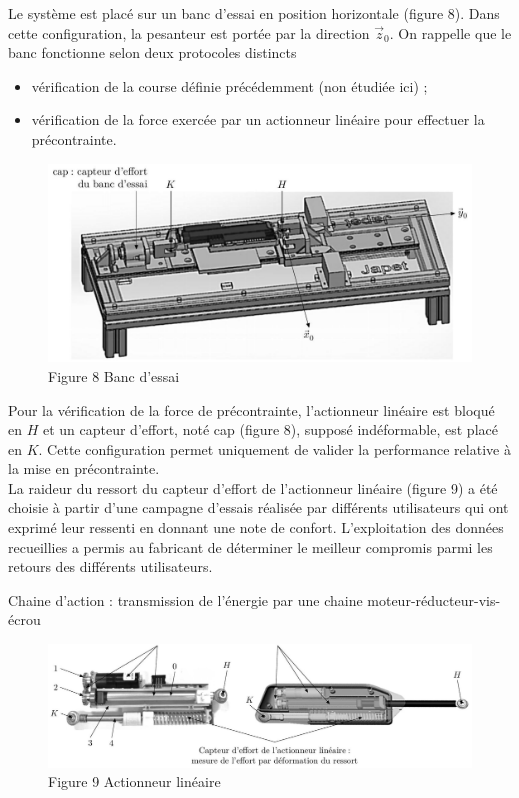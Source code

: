 \documentclass[10pt]{article}
\begin{document}
Le système est placé sur un banc d'essai en position horizontale (figure 8). Dans cette configuration, la pesanteur est portée par la direction $\vec{z}_{0}$. On rappelle que le banc fonctionne selon deux protocoles distincts

\begin{itemize}
  \item vérification de la course définie précédemment (non étudiée ici) ;
  \item vérification de la force exercée par un actionneur linéaire pour effectuer la précontrainte.
\end{itemize}

\begin{figure}[h]
\begin{center}
  \includegraphics[width=\textwidth]{2025_09_16_5f2d7643f7e649c6833dg-06(1)}
\captionsetup{labelformat=empty}
\caption{Figure 8 Banc d'essai}
\end{center}
\end{figure}

Pour la vérification de la force de précontrainte, l'actionneur linéaire est bloqué en $H$ et un capteur d'effort, noté cap (figure 8), supposé indéformable, est placé en $K$. Cette configuration permet uniquement de valider la performance relative à la mise en précontrainte.\\
La raideur du ressort du capteur d'effort de l'actionneur linéaire (figure 9) a été choisie à partir d'une campagne d'essais réalisée par différents utilisateurs qui ont exprimé leur ressenti en donnant une note de confort. L'exploitation des données recueillies a permis au fabricant de déterminer le meilleur compromis parmi les retours des différents utilisateurs.

Chaine d'action : transmission de l'énergie par une chaine moteur-réducteur-vis-écrou

\begin{figure}[h]
\begin{center}
  \includegraphics[width=\textwidth]{2025_09_16_5f2d7643f7e649c6833dg-06}
\captionsetup{labelformat=empty}
\caption{Figure 9 Actionneur linéaire}
\end{center}
\end{figure}
\end{document}

